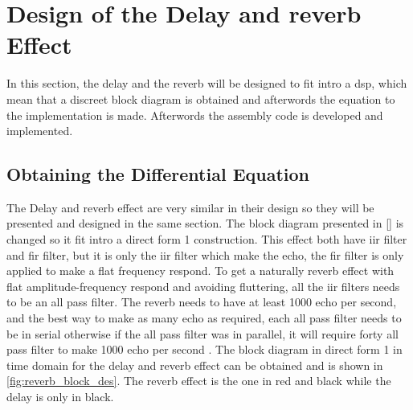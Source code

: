 \section{Design of the Delay and \gls{reverb} Effect}
In this section, the delay and the \gls{reverb} will be designed to fit intro a \gls{dsp}, which mean that a discreet block diagram is obtained and afterwords the equation to the implementation is made. Afterwords the assembly code is developed and implemented. 


\subsection{Obtaining the Differential Equation}
The Delay and \gls{reverb} effect are very similar in their design so they will be presented and designed in the same section. The block diagram presented in \autoref{} is changed so it fit intro a direct form 1 construction. This effect both have \gls{iir} filter and \gls{fir} filter, but it is only the \gls{iir} filter which make the echo, the \gls{fir} filter is only applied to make a flat frequency respond. To get a naturally \gls{reverb} effect with flat amplitude-frequency respond and avoiding fluttering, all the \gls{iir} filters needs to be an all pass filter. The \gls{reverb} needs to have at least 1000 echo per second, and the best way to make as many echo as required, each all pass filter needs to be in serial otherwise if the all pass filter was in parallel, it will require forty all pass filter to make 1000 echo per second \citep{natural_sounding_revorb}. The block diagram in direct form 1 in time domain for the delay and \gls{reverb} effect can be obtained and is shown in \autoref{fig:reverb_block_des}. The \gls{reverb} effect is the one in red and black while the delay is only in black. 

\newpage

